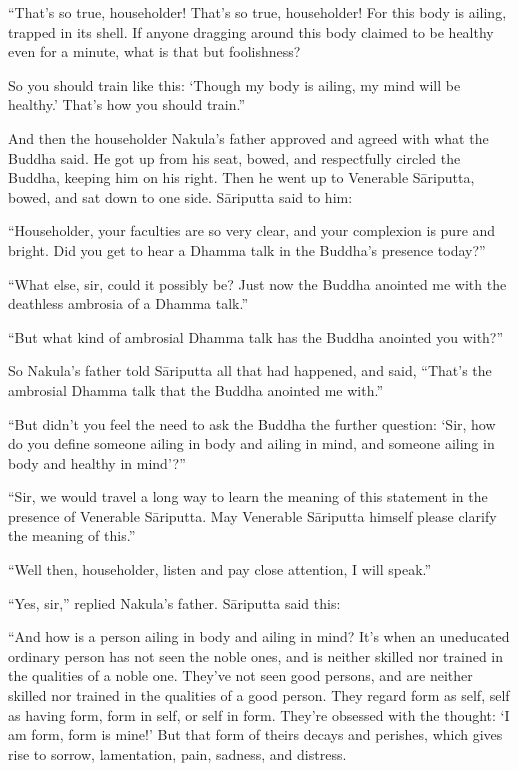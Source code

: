 \documentclass[12pt,openany]{book}%
\begin{document}
“That’s so true, householder! That’s so true, householder! For this body is ailing, trapped in its shell. If anyone dragging around this body claimed to be healthy even for a minute, what is that but foolishness? 

So you should train like this: ‘Though my body is ailing, my mind will be healthy.’ That’s how you should train.” 

And then the householder Nakula’s father approved and agreed with what the Buddha said. He got up from his seat, bowed, and respectfully circled the Buddha, keeping him on his right. Then he went up to Venerable \textsanskrit{Sāriputta}, bowed, and sat down to one side. \textsanskrit{Sāriputta} said to him: 

“Householder, your faculties are so very clear, and your complexion is pure and bright. Did you get to hear a Dhamma talk in the Buddha’s presence today?” 

“What else, sir, could it possibly be? Just now the Buddha anointed me with the deathless ambrosia of a Dhamma talk.” 

“But what kind of ambrosial Dhamma talk has the Buddha anointed you with?” 

So Nakula’s father told \textsanskrit{Sāriputta} all that had happened, and said, “That’s the ambrosial Dhamma talk that the Buddha anointed me with.” 

“But didn’t you feel the need to ask the Buddha the further question: ‘Sir, how do you define someone ailing in body and ailing in mind, and someone ailing in body and healthy in mind’?” 

“Sir, we would travel a long way to learn the meaning of this statement in the presence of Venerable \textsanskrit{Sāriputta}. May Venerable \textsanskrit{Sāriputta} himself please clarify the meaning of this.” 

“Well then, householder, listen and pay close attention, I will speak.” 

“Yes, sir,” replied Nakula’s father. \textsanskrit{Sāriputta} said this: 

“And how is a person ailing in body and ailing in mind? It’s when an uneducated ordinary person has not seen the noble ones, and is neither skilled nor trained in the qualities of a noble one. They’ve not seen good persons, and are neither skilled nor trained in the qualities of a good person. They regard form as self, self as having form, form in self, or self in form. They’re obsessed with the thought: ‘I am form, form is mine!’ But that form of theirs decays and perishes, which gives rise to sorrow, lamentation, pain, sadness, and distress. 
\end{document}
